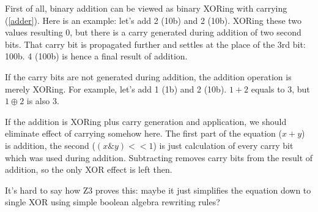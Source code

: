 First of all, binary addition can be viewed as binary XORing with carrying (\ref{adder}).
Here is an example: let's add 2 (10b) and 2 (10b).
XORing these two values resulting 0, but there is a carry generated during addition of two second bits.
That carry bit is propagated further and settles at the place of the 3rd bit: 100b.
4 (100b) is hence a final result of addition.

If the carry bits are not generated during addition, the addition operation is merely XORing.
For example, let's add 1 (1b) and 2 (10b). $1 + 2$ equals to 3, but $1 \oplus 2$ is also 3.

If the addition is XORing plus carry generation and application, we should eliminate effect of carrying somehow here.
The first part of the equation ($x + y$) is addition, the second ($(x \& y)<<1$) is just calculation of every carry bit which was used during addition.
Subtracting removes carry bits from the result of addition, so the only XOR effect is left then.

It's hard to say how Z3 proves this: maybe it just simplifies the equation down to single XOR using simple boolean algebra rewriting rules?

